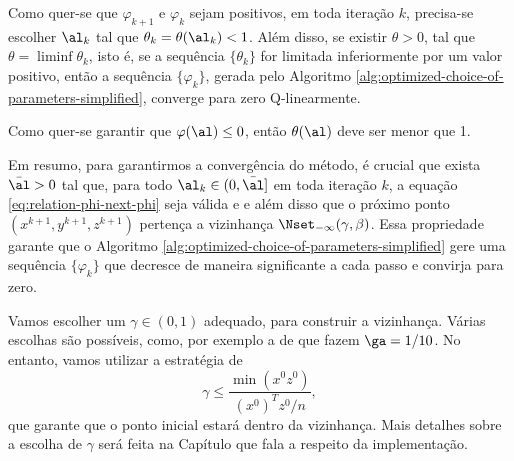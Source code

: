 Como quer-se que $\varphi_{k+1} $  e $\varphi_{k} $ sejam positivos, em toda iteração $k$, precisa-se escolher $\al_k$ tal que  $\theta_k = \theta(\al_k)<1$. Além disso, se existir $\theta>0$, tal que $\theta = \liminf \theta_k$, isto é, se a sequência $\{\theta_k\}$ for limitada inferiormente por um valor positivo, então a sequência $\{\varphi_k\}$, gerada pelo Algoritmo \ref{alg:optimized-choice-of-parameters-simplified}, converge para zero Q-linearmente.


Como quer-se garantir que $\varphi(\al) \leq  0$, então $\theta(\al)$ deve ser menor que 1. 


 Em resumo, para garantirmos a convergência do método, é crucial que exista $\bar{\al}>0$  tal que,  para todo $\al_k\in(0,\bar{\al}]$ em toda iteração $k$, a equação \eqref{eq:relation-phi-next-phi} seja válida e  e além disso que o próximo ponto  $({x}^{k+1} ,{y}^{k+1},{z}^{k+1})$ pertença a vizinhança $\Nset_{-\infty}(\gamma,\beta)$.
 Essa propriedade garante que  o Algoritmo \ref{alg:optimized-choice-of-parameters-simplified} gere uma sequência $\{\varphi_k\}$ que decresce de maneira significante a cada passo e convirja para zero.



Vamos escolher um $\gamma\in(0,1)$ adequado, para construir a vizinhança. Várias escolhas são possíveis, como, por exemplo a de \citet{Colombo:2008ia} que fazem $\ga = 1/10$. No entanto, vamos utilizar a estratégia de \citet{Zhang:2006ic}
\[
\gamma \leq \frac{\min(x^0z^0)}{(x^0)^Tz^0/n},
\]
que garante que o ponto inicial estará dentro da vizinhança. Mais detalhes sobre a escolha de $\gamma$ será feita na Capítulo que fala a respeito da implementação.






